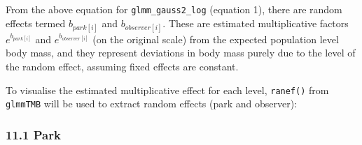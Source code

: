 \documentclass[
]{article}
\begin{document}
From the above equation for \texttt{glmm\_gauss2\_log} (equation 1),
there are random effects termed \(b_{park[i]}\) and \(b_{observer[i]}\).
These are estimated multiplicative factors \(e^{b_{park[i]}}\) and
\(e^{b_{observer[i]}}\) (on the original scale) from the expected
population level body mass, and they represent deviations in body mass
purely due to the level of the random effect, assuming fixed effects are
constant.

To visualise the estimated multiplicative effect for each level,
\texttt{ranef()} from \texttt{glmmTMB} will be used to extract random
effects (park and observer):

\subsubsection{11.1 Park}\label{park}
\end{document}
